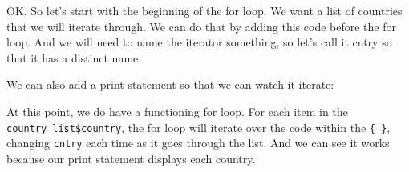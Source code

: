\documentclass[]{book}
\newenvironment{Shaded}{\begin{snugshade}}{\end{snugshade}}
\newcommand{\KeywordTok}[1]{\textcolor[rgb]{0.13,0.29,0.53}{\textbf{{#1}}}}
\newcommand{\DataTypeTok}[1]{\textcolor[rgb]{0.13,0.29,0.53}{{#1}}}
\newcommand{\DecValTok}[1]{\textcolor[rgb]{0.00,0.00,0.81}{{#1}}}
\newcommand{\StringTok}[1]{\textcolor[rgb]{0.31,0.60,0.02}{{#1}}}
\newcommand{\NormalTok}[1]{{#1}}
\theoremstyle{definition}
\theoremstyle{definition}
\theoremstyle{definition}
\theoremstyle{remark}
\begin{document}
OK. So let's start with the beginning of the for loop. We want a list of
countries that we will iterate through. We can do that by adding this
code before the for loop. And we will need to name the iterator
something, so let's call it cntry so that it has a distinct name.

We can also add a print statement so that we can watch it iterate:

\begin{Shaded}
\end{Shaded}

At this point, we do have a functioning for loop. For each item in the
\texttt{country\_list\$country}, the for loop will iterate over the code
within the \texttt{\{\ \}}, changing \texttt{cntry} each time as it goes
through the list. And we can see it works because our print statement
displays each country.
\end{document}
